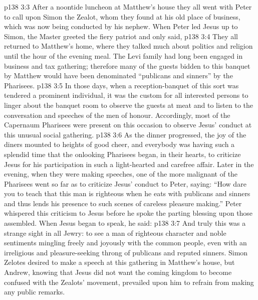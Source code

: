 \vs p138 3:3 \pc After a noontide luncheon at Matthew’s house they all went with Peter to call upon Simon the Zealot, whom they found at his old place of business, which was now being conducted by his nephew. When Peter led Jesus up to Simon, the Master greeted the fiery patriot and only said, 
\vs p138 3:4 \pc They all returned to Matthew’s home, where they talked much about politics and religion until the hour of the evening meal. The Levi family had long been engaged in business and tax gathering; therefore many of the guests bidden to this banquet by Matthew would have been denominated “publicans and sinners” by the Pharisees.
\vs p138 3:5 In those days, when a reception\hyp{}banquet of this sort was tendered a prominent individual, it was the custom for all interested persons to linger about the banquet room to observe the guests at meat and to listen to the conversation and speeches of the men of honour. Accordingly, most of the Capernaum Pharisees were present on this occasion to observe Jesus’ conduct at this unusual social gathering.
\vs p138 3:6 As the dinner progressed, the joy of the diners mounted to heights of good cheer, and everybody was having such a splendid time that the onlooking Pharisees began, in their hearts, to criticize Jesus for his participation in such a light\hyp{}hearted and carefree affair. Later in the evening, when they were making speeches, one of the more malignant of the Pharisees went so far as to criticize Jesus’ conduct to Peter, saying: “How dare you to teach that this man is righteous when he eats with publicans and sinners and thus lends his presence to such scenes of careless pleasure making.” Peter whispered this criticism to Jesus before he spoke the parting blessing upon those assembled. When Jesus began to speak, he said: 
\vs p138 3:7 And truly this was a strange sight in all Jewry: to see a man of righteous character and noble sentiments mingling freely and joyously with the common people, even with an irreligious and pleasure\hyp{}seeking throng of publicans and reputed sinners. Simon Zelotes desired to make a speech at this gathering in Matthew’s house, but Andrew, knowing that Jesus did not want the coming kingdom to become confused with the Zealots’ movement, prevailed upon him to refrain from making any public remarks.

